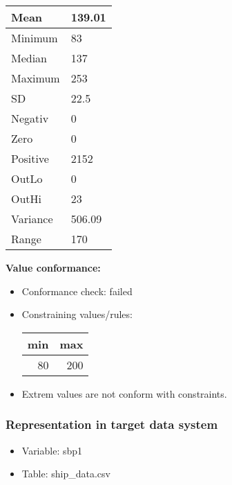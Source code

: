 \documentclass[
]{article}
\providecommand{\tightlist}{%
  \setlength{\itemsep}{0pt}\setlength{\parskip}{0pt}}
\begin{document}
\begin{table}[H]
\centering
\begin{tabular}{l|l}
\hline
Mean & 139.01\\
\hline
Minimum & 83\\
\hline
Median & 137\\
\hline
Maximum & 253\\
\hline
SD & 22.5\\
\hline
Negativ & 0\\
\hline
Zero & 0\\
\hline
Positive & 2152\\
\hline
OutLo & 0\\
\hline
OutHi & 23\\
\hline
Variance & 506.09\\
\hline
Range & 170\\
\hline
\end{tabular}
\end{table}

\textbf{Value conformance:}

\begin{itemize}
\tightlist
\item
  Conformance check: failed
\item
  Constraining values/rules:

  \begin{table}[H]
  \centering
  \begin{tabular}{r|r}
  \hline
  \textbf{min} & \textbf{max}\\
  \hline
  80 & 200\\
  \hline
  \end{tabular}
  \end{table}
\item
  Extrem values are not conform with constraints.
\end{itemize}

\newpage

\hypertarget{representation-in-target-data-system-21}{%
\subsubsection{\texorpdfstring{Representation in \textbf{target} data
system}{Representation in target data system}}\label{representation-in-target-data-system-21}}

\begin{itemize}
\tightlist
\item
  Variable: sbp1
\item
  Table: ship\_data.csv
\end{itemize}
\end{document}
